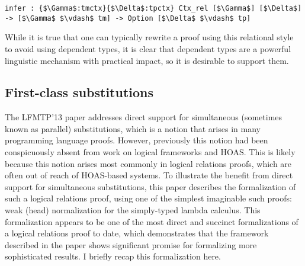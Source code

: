 \documentclass{article}
\begin{document}
\begin{lstlisting}
infer : {$\Gamma$:tmctx}{$\Delta$:tpctx} Ctx_rel [$\Gamma$] [$\Delta$] -> [$\Gamma$ $\vdash$ tm] -> Option [$\Delta$ $\vdash$ tp]
\end{lstlisting}

While it is true that one can typically rewrite a proof using this
relational style to avoid using dependent types, it is clear that dependent types are a
powerful linguistic mechanism with practical impact,
 so it is desirable to support them.

\subsection{First-class substitutions}\label{sec:lfmtp13}
The LFMTP'13 paper \citep{Cave13} addresses direct support for
simultaneous (sometimes known as parallel)
substitutions, which is a notion that arises in many programming
language proofs. However, previously this notion had been
conspicuously absent from work on logical frameworks and HOAS. This is
likely because this notion arises most commonly in logical relations
proofs, which are often out of reach of HOAS-based systems. To
illustrate the benefit from direct support for
simultaneous substitutions, this paper describes the formalization of such
a logical relations proof, using one of the simplest
imaginable such proofs: weak (head) normalization for the
simply-typed lambda calculus. This formalization appears to be one of
the most direct and succinct formalizations of a logical relations
proof to date, which demonstrates that the framework described in the
paper shows significant promise for formalizing more sophisticated results. I briefly recap
this formalization here. 



\end{document}
